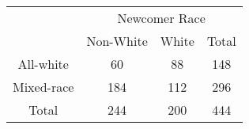 \begin{table}[htbp]
\begin{tabular}{c c c c}
\toprule
                   &\multicolumn{3}{c}{Newcomer Race}  \\
                   &      Non-White  &   White &    Total    \\
\midrule
All-white            &      60 &         88 &       148     \\
\midrule
Mixed-race          &      184 &         112 &      296   \\
\midrule
Total              &      244 &       200 &      444  \\
\bottomrule
\end{tabular}
\end{table}